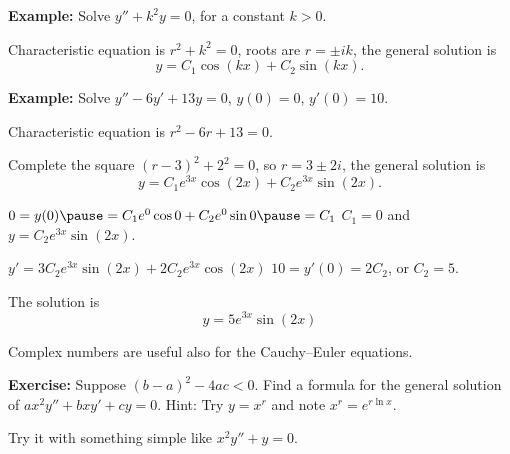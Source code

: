 \documentclass[10pt,aspectratio=169]{beamer}
\begin{document}
\begin{frame}

\textbf{Example:} Solve \quad $y'' + k^2 y = 0$, \quad for a constant $k > 0$.

\medskip
\pause

Characteristic equation is $r^2 + k^2 = 0$,
\pause
roots are $r = \pm ik$,
\pause
the general solution is
\[
y = C_1 \cos (kx) + C_2 \sin (kx) .
\]

\medskip
\pause

\textbf{Example:}
Solve \quad $y'' - 6 y' + 13 y = 0$, \quad $y(0) = 0$, $y'(0) = 10$.

\medskip
\pause

Characteristic equation is $r^2 - 6 r + 13 = 0$.

\pause
Complete the square ${(r-3)}^2 + 2^2 = 0$,
\pause
so $r = 3 \pm 2i$,
\pause
the general solution is
\[
y =
C_1 e^{3x} \cos (2x) + C_2 e^{3x} \sin (2x).
\]

\medskip
\pause

$0 = y(0)
\pause
= C_1 e^{0} \cos 0 + C_2 e^{0} \sin 0
\pause
= C_1$
\pause
\wthus $C_1 = 0$ and $y = C_2 e^{3x} \sin (2x)$.

\medskip
\pause
$y' = 3C_2 e^{3x} \sin (2x) + 2C_2 e^{3x} \cos (2x)$
\pause
\wthus $10 = y'(0) = 2C_2$, or $C_2 = 5$.

\medskip
\pause
The solution is
\[
y = 5 e^{3x} \sin (2x) 
\]

\end{frame}

\begin{frame}
Complex numbers are useful also for the Cauchy--Euler equations.

\medskip

\textbf{Exercise:}
Suppose ${(b-a)}^2-4ac < 0$.  Find a formula for the general solution
of $a x^2 y'' + b x y' + c y = 0$.  Hint: Try $y=x^r$ and note $x^r = e^{r \ln x}$.

\medskip
\pause

Try it with something simple like $x^2 y'' + y = 0$.

\end{frame}
\end{document}
